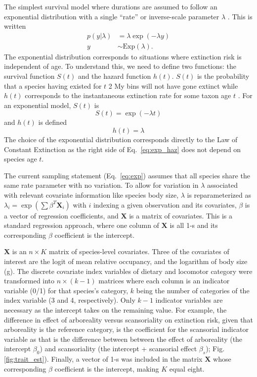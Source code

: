 \documentclass{pnastwo}
\begin{document}
\begin{article}
\begin{materials}
The simplest survival model where durations are assumed to follow an exponential distribution with a single ``rate'' or inverse-scale parameter \(\lambda\) \cite{Klein2003}. This is written
\begin{align}
  p(y | \lambda) &= \lambda \exp(-\lambda y) \nonumber \\
  y &\sim \mathrm{Exp}(\lambda).
  \label{eq:exp}
\end{align}
The exponential distribution corresponds to situations where extinction risk is independent of age. To understand this, we need to define two functions: the survival function \(S(t)\) and the hazard function \(h(t)\). \(S(t)\) is the probability that a species having existed for \(t\) 2 My bins will not have gone extinct while \(h(t)\) corresponds to the instantaneous extinction rate for some taxon age \(t\) \cite{Klein2003}. For an exponential model, \(S(t)\) is 
\begin{equation}
  S(t) = \exp(-\lambda t)
  \label{eq:exp_surv}
\end{equation}
and \(h(t)\) is defined
\begin{equation}
  h(t) = \lambda
  \label{eq:exp_haz}
\end{equation}
The choice of the exponential distribution corresponds directly to the Law of Constant Extinction \cite{VanValen1973} as the right side of Eq.~\ref{eq:exp_haz} does not depend on species age \(t\). 

The current sampling statement (Eq.~\ref{eq:exp}) assumes that all species share the same rate parameter with no variation. To allow for variation in \(\lambda\) associated with relevant covariate information like species body size, \(\lambda\) is reparameterized as \(\lambda_{i} = \exp(\sum \beta^{T}\mathbf{X}_{i})\) with \(i\) indexing a given observation and its covariates, \(\beta\) is a vector of regression coefficients, and \(\mathbf{X}\) is a matrix of covariates. This is a standard regression approach, where one column of \(\mathbf{X}\) is all 1-s and its corresponding \(\beta\) coefficient is the intercept. 

\(\mathbf{X}\) is an \(n \times K\) matrix of species-level covariates. Three of the covariates of interest are the logit of mean relative occupancy, and the logarithm of body size (g). The discrete covariate index variables of dietary and locomotor category were transformed into \(n \times (k - 1)\) matrices where each column is an indicator variable (0/1) for that species's category, \(k\) being the number of categories of the index variable (3 and 4, respectively). Only \(k - 1\) indicator variables are necessary as the intercept takes on the remaining value. For example, the difference in effect of arboreality versus scansoriality on extinction risk, given that arboreality is the reference category, is the coefficient for the scansorial indicator variable as that is the difference between between the effect of arboreality (the intercept \(\beta_{0}\)) and scansoriality (the intercept + scansorial effect \(\beta_{s}\)); Fig. \ref{fig:trait_est}). Finally, a vector of 1-s was included in the matrix \(\mathbf{X}\) whose corresponding \(\beta\) coefficient is the intercept, making \(K\) equal eight.


\end{materials}
\end{article}
\end{document}
